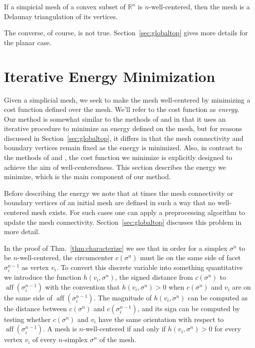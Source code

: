 \documentclass[final]{siamltex}
\newcommand{\Real}{\ensuremath{\mathbb{R}}} \newcommand{\meshM}{\ensuremath{\mathcal{M}}} \newcommand{\meshV}{\ensuremath{\mathcal{V}}} \newcommand{\meshT}{\ensuremath{\mathcal{T}}} \newcommand{\interior}{\ensuremath{\mathrm{Int}}}
\DeclareMathOperator{\aff}{aff}
\begin{document}
\bigskip

\begin{corollary}
  \label{cor:Delaunay}
  If a simpicial mesh of a convex subset of $\Real^{n}$ is
  $n$-well-centered, then the mesh is a Delaunay triangulation of its
  vertices.
\end{corollary}

\bigskip

The converse, of course, is not true.  Section~\ref{sec:globaltop}
gives more details for the planar case.


\section{Iterative Energy Minimization}
\label{sec:iterative}
Given a simplicial mesh, we seek to make the mesh well-centered by
minimizing a cost function defined over the mesh. We'll refer to the
cost function as \emph{energy}. Our method is somewhat similar to the
methods of \cite{AlCoYvDe2005} and \cite{DuFaGu1999} in that it uses
an iterative procedure to minimize an energy defined on the mesh, but
for reasons discussed in Section~\ref{sec:globaltop}, it differs in that
the mesh connectivity and boundary vertices remain fixed as the energy
is minimized.  Also, in contrast to the methods of \cite{AlCoYvDe2005}
and \cite{DuFaGu1999}, the cost function we minimize is explicitly
designed to achieve the aim of well-centeredness.  This section
describes the energy we minimize, which is the main component of our
method.


Before describing the energy we note that at times the mesh
connectivity or boundary vertices of an initial mesh are defined in
such a way that no well-centered mesh exists.  For such cases one can
apply a preprocessing algorithm to update the mesh connectivity.
Section~\ref{sec:globaltop} discusses this problem in more detail.


In the proof of Thm.~\ref{thm:characterize} we see that in order for a
simplex $\sigma^{n}$ to be $n$-well-centered, the circumcenter
$c(\sigma^{n})$ must lie on the same side of facet $\sigma^{n-1}_{i}$
as vertex $v_{i}$.  To convert this discrete variable into something
quantitative we introduce the function $h(v_{i}, \sigma^{n})$, the
signed distance from $c(\sigma^{n})$ to $\aff(\sigma^{n-1}_{i})$ with
the convention that $h(v_{i}, \sigma^{n}) > 0$ when $c(\sigma^{n})$
and $v_{i}$ are on the same side of $\aff(\sigma^{n-1}_{i})$.  The
magnitude of $h(v_{i}, \sigma^{n})$ can be computed as the distance
between $c(\sigma^{n})$ and $c(\sigma^{n-1}_{i})$, and its sign can be
computed by testing whether $c(\sigma^{n})$ and $v_{i}$ have the same
orientation with respect to $\aff(\sigma^{n-1}_{i})$.
A mesh is $n$-well-centered if and only
if $h(v_{i}, \sigma^{n}) > 0$ for every vertex
$v_{i}$ of every $n$-simplex $\sigma^{n}$ of the mesh.
\end{document}

